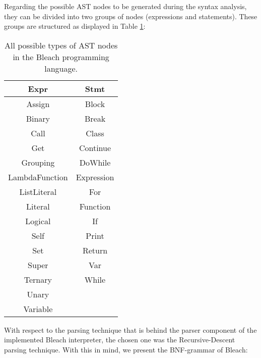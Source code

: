 Regarding the possible AST nodes to be generated during the syntax analysis, they can be divided into two groups of nodes (expressions and statements). These groups are structured as displayed in Table \ref{tab:ASTNodes}:

\begin{table}[h!]
\centering
    \begin{tabular}{|c|c|}
    \hline
    \textbf{Expr} & \textbf{Stmt} \\ \hline
    Assign & Block \\ \hline
    Binary & Break \\ \hline
    Call & Class \\ \hline
    Get & Continue \\ \hline
    Grouping & DoWhile \\ \hline
    LambdaFunction & Expression \\ \hline
    ListLiteral & For \\ \hline
    Literal & Function \\ \hline
    Logical & If \\ \hline
    Self & Print \\ \hline
    Set & Return \\ \hline
    Super & Var \\ \hline  
    Ternary & While \\ \hline
    Unary &  \\ \hline
    Variable &  \\ \hline
    \end{tabular}
    \caption{All possible types of AST nodes in the Bleach programming language. \newline}
    \label{tab:ASTNodes}  %
\end{table}

\newpage

With respect to the parsing technique that is behind the parser component of the implemented Bleach interpreter, the chosen one was the Recursive-Descent parsing technique. With this in mind, we present the BNF-grammar of Bleach: \newline

